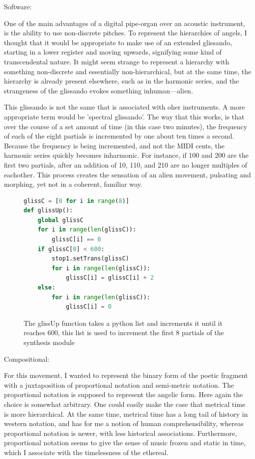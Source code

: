 \documentclass[12pt,twoside,maitrise]{dms_ks}
\theoremstyle{definition}
\begin{document}
Software:

One of the main advantages of a digital pipe-organ over an acoustic instrument, is the ability to use non-discrete pitches.
To represent the hierarchies of angels, I thought that it would be appropriate to make use of an extended glissando, starting in a lower register and moving upwards, signifying some kind of transcendental nature.
It might seem strange to represent a hierarchy with something non-discrete and essentially non-hierarchical, but at the same time, the hierarchy is already present elsewhere, such as in the harmonic series, and the strangeness of the glissando evokes something inhuman---alien.

This glissando is not the same that is associated with oher instruments. A more appropriate term would be 'spectral glissando'. The way that this works, is that over the course of a set amount of time (in this case two minutes), the frequency of each of the eight partials is incremented by one about ten times a second.
Because the frequency is being incremented, and not the MIDI cents, the harmonic series quickly becomes inharmonic.
For instance, if 100 and 200 are the first two partials, after an addition of 10, 110, and 210 are no longer multiples of eachother.
This process creates the sensation of an alien movement, pulsating and morphing, yet not in a coherent, familiar way.    

\begin{figure}[H]
\begin{lstlisting}[language=Python]
glissC = [0 for i in range(8)]
def glissUp():
    global glissC
    for i in range(len(glissC)):
        glissC[i] == 0
    if glissC[0] < 600:
        stop1.setTrans(glissC)
        for i in range(len(glissC)):
            glissC[i] = glissC[i] + 2
    else:
        for i in range(len(glissC)):
            glissC[i] = 0
\end{lstlisting}
\caption{The glissUp function takes a python list and increments it until it reaches 600, this list is used to increment the first 8 partials of the synthesis module}
\end{figure}

Compositional:

For this movement, I wanted to represent the binary form of the poetic fragment with a juxtaposition of proportional notation and semi-metric notation.
The proportional notation is supposed to represent the angelic form.
Here again the choice is somewhat arbitrary.
One could easily make the case that metrical time is more hierarchical.
At the same time, metrical time has a long tail of history in western notation, and has for me a notion of human comprehensibility, whereas proportional notation is newer, with less historical associations.
Furthermore, proportional notation seems to give the sense of music frozen and static in time, which I associate with the timelessness of the ethereal.
\end{document}
